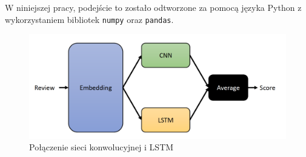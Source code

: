 W niniejszej pracy, podejście to zostało odtworzone za pomocą języka Python z wykorzystaniem bibliotek \verb_numpy_ oraz \verb_pandas_.

\begin{figure}[H]
	\centering
	\includegraphics[width=1\linewidth]{images/chapter2/ensemble.pdf}
	\caption{Połączenie sieci konwolucyjnej i LSTM \cite{minaee2019deep}}
	\label{fig:ensemble}
\end{figure}